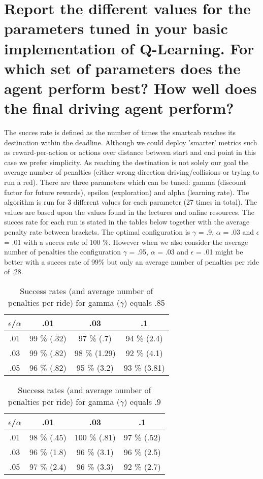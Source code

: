\documentclass{article}
\begin{document}
\section*{Report the different values for the parameters tuned in your basic implementation of Q-Learning. For which set of parameters does the agent perform best? How well does the final driving agent perform?}

The succes rate is defined as the number of times the smartcab reaches its destination within the deadline. Although we could deploy 'smarter' metrics such as reward-per-action or actions over distance between start and end point in this case we prefer simplicity. As reaching the destination is not solely our goal the average number of penalties (either wrong direction driving/collisions or trying to run a red). There are three parameters which can be tuned: gamma (discount factor for future rewards), epsilon (exploration) and alpha (learning rate). The algorithm is run for 3 different values for each parameter (27 times in total). The values are based upon the values found in the lectures and online resources. The succes rate for each run is stated in the tables below together with the average penalty rate between brackets. The optimal configuration is $\gamma$ = .9, $\alpha$ = .03 and $\epsilon$ = .01 with a succes rate of 100 \%. However when we also consider the average number of penalties the configuration $\gamma$ = .95, $\alpha$ = .03 and $\epsilon$ = .01 might be better with a succes rate of 99\% but  only an average number of penalties per ride of .28.

\begin{table}
\centering
\begin{tabular}{c | c | c | c |}
\hline
$\epsilon$/$\alpha$ & .01 & .03 & .1 \\ \hline
.01 & 99 \% (.32)& 97 \% (.7)& 94 \% (2.4)\\ \hline
.03 & 99 \% (.82)& 98 \% (1.29)& 92 \% (4.1)\\ \hline
.05 & 96 \% (.82)& 95 \% (3.2)& 93 \% (3.81)\\ \hline
\end{tabular}
\caption{Success rates  (and average number of penalties per ride) for gamma ($\gamma$) equals .85}
\end{table}

\begin{table}
\centering
\begin{tabular}{c | c | c | c |}
\hline
$\epsilon$/$\alpha$ & .01 & .03 & .1 \\ \hline
.01 & 98 \% (.45)& 100 \% (.81)& 97 \% (.52)\\ \hline
.03 & 96 \% (1.8)& 96 \% (3.1)& 96 \% (2.5)\\ \hline
.05 & 97 \% (2.4)& 96 \% (3.3)&  92 \%  (2.7)\\ \hline
\end{tabular}
\caption{Success rates (and average number of penalties per ride) for gamma ($\gamma$) equals .9}
\end{table}
\end{document}
